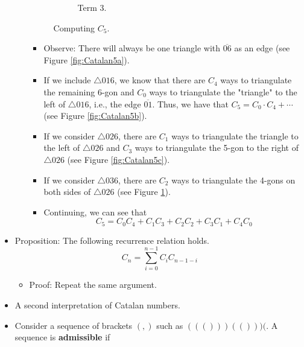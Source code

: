 \documentclass[../main.tex]{subfiles}
\begin{document}
\begin{itemize}
\begin{itemize}
\begin{figure}[h!]
\begin{subfigure}[b]{0.24\linewidth}
                \caption{Term 3.}
                \label{fig:Catalan5d}
            \end{subfigure}
            \caption{Computing $C_5$.}
            \label{fig:Catalan5}
        \end{figure}
        \begin{itemize}
            \item Observe: There will always be one triangle with $\overline{06}$ as an edge (see Figure \ref{fig:Catalan5a}).
            \item If we include $\triangle 016$, we know that there are $C_4$ ways to triangulate the remaining 6-gon and $C_0$ ways to triangulate the "triangle" to the left of $\triangle 016$, i.e., the edge $\overline{01}$. Thus, we have that $C_5=C_0\cdot C_4+\cdots$ (see Figure \ref{fig:Catalan5b}).
            \item If we consider $\triangle 026$, there are $C_1$ ways to triangulate the triangle to the left of $\triangle 026$ and $C_3$ ways to triangulate the 5-gon to the right of $\triangle 026$ (see Figure \ref{fig:Catalan5c}).
            \item If we consider $\triangle 036$, there are $C_2$ ways to triangulate the 4-gons on both sides of $\triangle 026$ (see Figure \ref{fig:Catalan5d}).
            \item Continuing, we can see that
            \begin{equation*}
                C_5 = C_0C_4+C_1C_3+C_2C_2+C_3C_1+C_4C_0
            \end{equation*}
        \end{itemize}
    \end{itemize}
    \item Proposition: The following recurrence relation holds.
    \begin{equation*}
        C_n = \sum_{i=0}^{n-1}C_iC_{n-1-i}
    \end{equation*}
    \begin{itemize}
        \item Proof: Repeat the same argument.
    \end{itemize}
    \item A second interpretation of Catalan numbers.
    \item Consider a sequence of brackets $(,)$ such as $((()))(()))($. A sequence is \textbf{admissible} if
    \begin{enumerate}

\end{enumerate}
\end{itemize}
\end{document}

